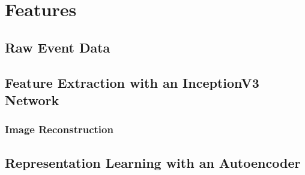 \chapter{Features}
\label{cha:features}

\section{Raw Event Data}
\label{sec:raw-event-data}

\section{Feature Extraction with an InceptionV3 Network}
\label{sec:feat-extr-with}

\subsection{Image Reconstruction}
\label{sec:image-reconstruction}

\section{Representation Learning with an Autoencoder}
\label{sec:repr-learn-with}
